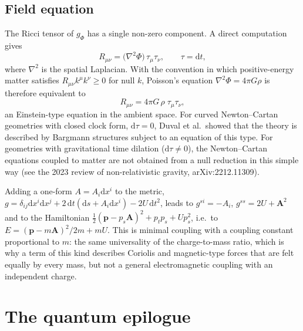 \subsection{Field equation}

The Ricci tensor of $g_\Phi$ has a single non-zero component. A direct
computation gives
\begin{equation}
  R_{\mu\nu}=\bigl(\nabla^2\Phi\bigr)\,\tau_\mu\tau_\nu,\qquad \tau=\mathrm{d}t,
  \label{nr:Ricci}
\end{equation}
where $\nabla^2$ is the spatial Laplacian. With the convention in which
positive-energy matter satisfies $R_{\mu\nu}k^\mu k^\nu\ge0$ for null $k$,
Poisson's equation $\nabla^2\Phi=4\pi G\rho$ is therefore equivalent to
\begin{equation}
  R_{\mu\nu}=4\pi G\,\rho\;\tau_\mu\tau_\nu ,
  \label{nr:field}
\end{equation}
an Einstein-type equation in the ambient space. For curved
Newton--Cartan geometries with closed clock form, $\mathrm{d}\tau=0$, Duval et
al.\ showed that the theory is described by Bargmann structures subject to an
equation of this type. For geometries with gravitational time dilation
($\mathrm{d}\tau\neq0$), the Newton--Cartan equations coupled to matter are not
obtained from a null reduction in this simple way (see the 2023 review of
non-relativistic gravity, arXiv:2212.11309).

\begin{nrrem}
Adding a one-form $A=A_i\mathrm{d}x^i$ to the metric,
$g=\delta_{ij}\mathrm{d}x^i\mathrm{d}x^j+2\,\mathrm{d}t(\mathrm{d}s+A_i\mathrm{d}x^i)-2U\,\mathrm{d}t^2$,
leads to $g^{si}=-A_i$, $g^{ss}=2U+\mathbf{A}^2$ and to the
Hamiltonian $\tfrac12(\mathbf{p}-p_s\mathbf{A})^2+p_tp_s+Up_s^2$, i.e.\ to
$E=(\mathbf{p}-m\mathbf{A})^2/2m+mU$. This is minimal coupling with a coupling
constant proportional to $m$: the same universality of the
charge-to-mass ratio, which is why a term of this kind describes Coriolis
and magnetic-type forces that are felt equally by every mass, but not
a general electromagnetic coupling with an independent charge.
\end{nrrem}

\section{The quantum epilogue}
\label{sec:nr-quantum}


